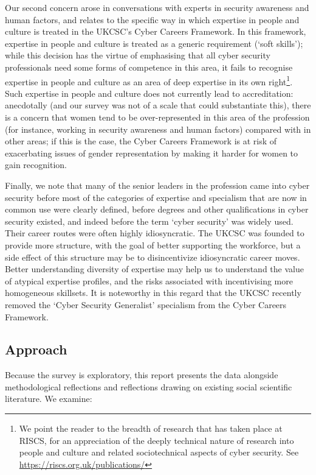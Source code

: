 \documentclass[
  a4paper,
]{book}
\begin{document}
Our second concern arose in conversations with experts in security
awareness and human factors, and relates to the specific way in which
expertise in people and culture is treated in the UKCSC's Cyber Careers
Framework. In this framework, expertise in people and culture is treated
as a generic requirement (`soft skills'); while this decision has the
virtue of emphasising that all cyber security professionals need some
forms of competence in this area, it fails to recognise expertise in
people and culture as an area of deep expertise in its own
right\footnote{We point the reader to the breadth of research that has
  taken place at RISCS, for an appreciation of the deeply technical
  nature of research into people and culture and related sociotechnical
  aspects of cyber security. See
  \url{https://riscs.org.uk/publications/}}. Such expertise in people
and culture does not currently lead to accreditation: anecdotally (and
our survey was not of a scale that could substantiate this), there is a
concern that women tend to be over-represented in this area of the
profession (for instance, working in security awareness and human
factors) compared with in other areas; if this is the case, the Cyber
Careers Framework is at risk of exacerbating issues of gender
representation by making it harder for women to gain recognition.

Finally, we note that many of the senior leaders in the profession came
into cyber security before most of the categories of expertise and
specialism that are now in common use were clearly defined, before
degrees and other qualifications in cyber security existed, and indeed
before the term `cyber security' was widely used. Their career routes
were often highly idiosyncratic. The UKCSC was founded to provide more
structure, with the goal of better supporting the workforce, but a side
effect of this structure may be to disincentivize idiosyncratic career
moves. Better understanding diversity of expertise may help us to
understand the value of atypical expertise profiles, and the risks
associated with incentivising more homogeneous skillsets. It is
noteworthy in this regard that the UKCSC recently removed the `Cyber
Security Generalist' specialism from the Cyber Careers Framework.

\subsection{Approach}\label{approach}

Because the survey is exploratory, this report presents the data
alongside methodological reflections and reflections drawing on existing
social scientific literature. We examine:
\end{document}
